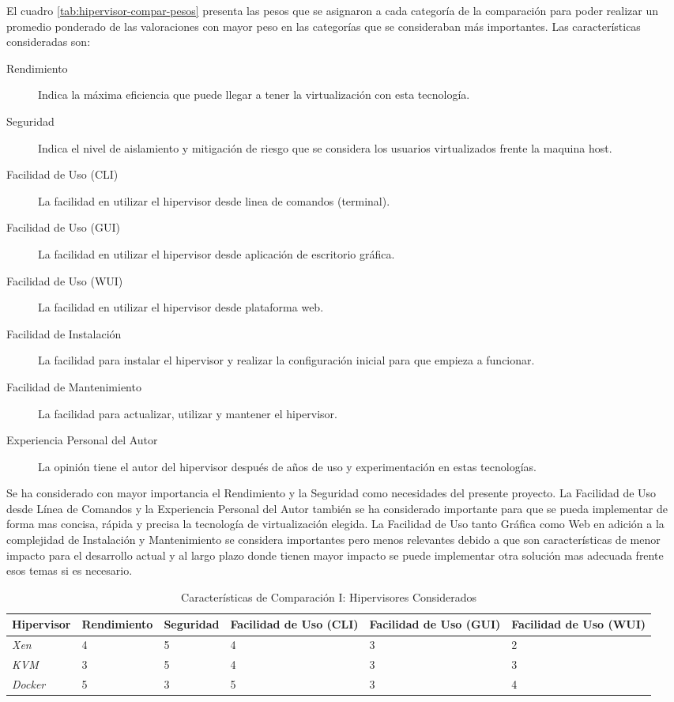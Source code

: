 El cuadro \ref{tab:hipervisor-compar-pesos} presenta las pesos que se asignaron a cada categoría de la comparación para poder realizar un promedio ponderado de las valoraciones con mayor peso en las categorías que se consideraban más importantes. Las características consideradas son:
\begin{description}
	\item[Rendimiento] Indica la máxima eficiencia que puede llegar a tener la virtualización con esta tecnología.
    \item[Seguridad] Indica el nivel de aislamiento y mitigación de riesgo que se considera los usuarios virtualizados frente la maquina host.
    \item[Facilidad de Uso (CLI)] La facilidad en utilizar el hipervisor desde linea de comandos (terminal).
    \item[Facilidad de Uso (GUI)] La facilidad en utilizar el hipervisor desde aplicación de escritorio gráfica.
    \item[Facilidad de Uso (WUI)] La facilidad en utilizar el hipervisor desde plataforma web.
    \item[Facilidad de Instalación] La facilidad para instalar el hipervisor y realizar la configuración inicial para que empieza a funcionar.
    \item[Facilidad de Mantenimiento] La facilidad para actualizar, utilizar y mantener el hipervisor.
    \item[Experiencia Personal del Autor] La opinión tiene el autor del hipervisor después de años de uso y experimentación en estas tecnologías.
\end{description}
Se ha considerado con mayor importancia el Rendimiento y la Seguridad como necesidades del presente proyecto. La Facilidad de Uso desde Línea de Comandos y la Experiencia Personal del Autor también se ha considerado importante para que se pueda implementar de forma mas concisa, rápida y precisa la tecnología de virtualización elegida. La Facilidad de Uso tanto Gráfica como Web en adición a la complejidad de Instalación y Mantenimiento se considera importantes pero menos relevantes debido a que son características de menor impacto para el desarrollo actual y al largo plazo donde tienen mayor impacto se puede implementar otra solución mas adecuada frente esos temas si es necesario. 

\begin{table}
	\centering
	\begin{tabular}{|p{1.85cm}|p{2.25cm}|p{1.8cm}|p{1.7cm}|p{1.7cm}|p{1.7cm}|}
    	\hline
		\textbf{Hipervisor} & \textbf{Rendimiento} & \textbf{Seguridad} & \textbf{Facilidad de Uso (CLI)} & \textbf{Facilidad de Uso (GUI)} & \textbf{Facilidad de Uso (WUI)} \\
        \hline
        \textit{Xen} & 4 & 5 & 4 & 3 & 2 \\
        \hline
        \textit{KVM} & 3 & 5 & 4 & 3 & 3 \\
        \hline
        \textit{Docker} & 5 & 3 & 5 & 3 & 4 \\
        \hline
	\end{tabular}
    \caption{Características de Comparación I: Hipervisores Considerados}
    \label{tab:hipervisor-compar-i}
\end{table}

